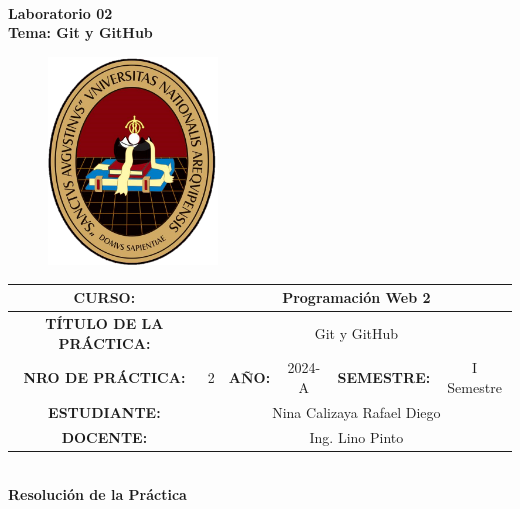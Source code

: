 \documentclass{article}
\begin{document}


\begin{center}
	\Huge \textbf{\\  \Large Laboratorio 02 \\ \Large Tema: Git y GitHub}
\end{center}


\begin{figure}[htbp]
  \centering
  \includegraphics[width=0.4\textwidth]{img/logoUnsa.png}
\end{figure}


\noindent
\renewcommand{\arraystretch}{2}
\begin{table}[h]
\centering
\begin{tabular}{|c|c|c|c|c|c||}
\hline
\multicolumn{1}{|c|}{\textbf{\scriptsize CURSO:}} & \multicolumn{5}{|c|}{\small Programación Web 2} \\ \hline
\multicolumn{1}{|c|}{\textbf{\scriptsize TÍTULO DE LA PRÁCTICA:}} & \multicolumn{5}{|c|}{\small Git y GitHub} \\ \hline
\multicolumn{1}{|c|}{\textbf{\scriptsize NRO DE PRÁCTICA:}} & \multicolumn{1}{|c|}{\small 2}& \multicolumn{1}{|c|}{\textbf{\footnotesize AÑO:}} & \multicolumn{1}{|c|}{\small 2024-A} & \multicolumn{1}{|c|}{\textbf{\footnotesize SEMESTRE:}} & \multicolumn{1}{|c|}{\small I Semestre} \\ \hline \multicolumn{1}{|c|}{\textbf{\scriptsize ESTUDIANTE:}} & \multicolumn{5}{|c|}{\small Nina Calizaya Rafael Diego} \\ \hline  \multicolumn{1}{|c|}{\textbf{\scriptsize DOCENTE:}} & \multicolumn{5}{|c|}{\small Ing. Lino Pinto} \\ \hline
\end{tabular}
\end{table}

\clearpage
\begin{center}
	\Huge \textbf{\\ \Large Resolución de la Práctica \\}
\end{center}
\end{document}
